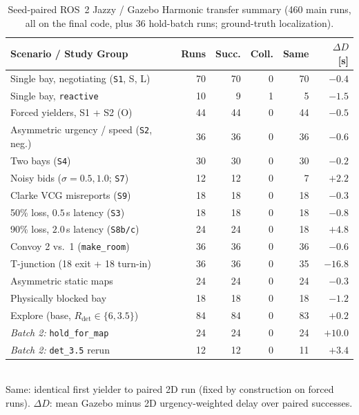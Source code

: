 \begin{table}[!t]\centering
\caption{Seed-paired ROS~2 Jazzy / Gazebo Harmonic transfer summary (460 main runs, all on the final code, plus 36 hold-batch runs; ground-truth localization).}
\label{tab:gz}
{\footnotesize\setlength{\tabcolsep}{3.0pt}
\begin{tabular}{@{}lrrrrr@{}}\toprule
Scenario / Study Group & Runs & Succ. & Coll. & Same & $\Delta D$ [s] \\\midrule
Single bay, negotiating (\texttt{S1}, S, L) & 70 & 70 & 0 & 70 & $-0.4$ \\
Single bay, \texttt{reactive}               & 10 &  9 & 1 &  5 & $-1.5$ \\
Forced yielders, S1 + S2 (O)             & 44 & 44 & 0 & 44 & $-0.5$ \\
Asymmetric urgency / speed (\texttt{S2}, neg.)    & 36 & 36 & 0 & 36 & $-0.6$ \\
Two bays (\texttt{S4})                      & 30 & 30 & 0 & 30 & $-0.2$ \\
Noisy bids ($\sigma=0.5, 1.0$; \texttt{S7}) & 12 & 12 & 0 &  7 & $+2.2$ \\
Clarke VCG misreports (\texttt{S9})         & 18 & 18 & 0 & 18 & $-0.3$ \\
50\% loss, $0.5$\,s latency (\texttt{S3})   & 18 & 18 & 0 & 18 & $-0.8$ \\
90\% loss, $2.0$\,s latency (\texttt{S8b/c})& 24 & 24 & 0 & 18 & $+4.8$ \\
Convoy 2 vs.\ 1 (\texttt{make\_room})       & 36 & 36 & 0 & 36 & $-0.6$ \\
T-junction (18 exit + 18 turn-in)           & 36 & 36 & 0 & 35 & $-16.8$ \\
Asymmetric static maps                      & 24 & 24 & 0 & 24 & $-0.3$ \\
Physically blocked bay                      & 18 & 18 & 0 & 18 & $-1.2$ \\
Explore (base, $R_{\mathrm{det}}\in\{6,3.5\}$) & 84 & 84 & 0 & 83 & $+0.2$ \\\midrule
\emph{Batch 2:} \texttt{hold\_for\_map}     & 24 & 24 & 0 & 24 & $+10.0$ \\
\emph{Batch 2:} \texttt{det\_3.5} rerun     & 12 & 12 & 0 & 11 & $+3.4$ \\\bottomrule
\end{tabular}}\\[2pt]
{\footnotesize Same: identical first yielder to paired 2D run (fixed by construction on forced runs). $\Delta D$: mean Gazebo minus 2D urgency-weighted delay over paired successes.}
\end{table}

